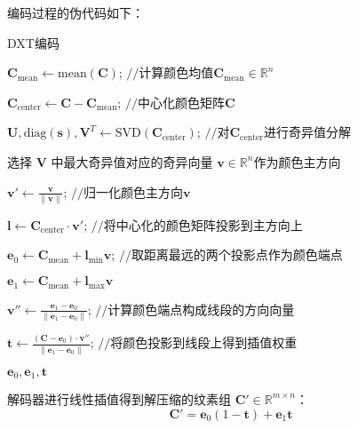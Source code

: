 编码过程的伪代码如下：

\begin{algorithm}[H]
    \caption{DXT编码}
    
    $\mathbf{C}_{\text{mean}} \gets \text{mean}(\mathbf{C})$; \hfill $//$计算颜色均值$\mathbf{C}_{\text{mean}}\in\mathbb{R}^{n}$
    
    $\mathbf{C}_{\text{center}} \gets \mathbf{C} - \mathbf{C}_{\text{mean}}$; \hfill $//$中心化颜色矩阵$\mathbf{C}$
    
    $ \mathbf{U}, \text{diag}(\mathbf{s}), \mathbf{V}^T \gets \text{SVD}(\mathbf{C}_{\text{center}})$; \hfill $//$对$\mathbf{C}_{\text{center}}$进行奇异值分解
    
    选择 $\mathbf{V}$ 中最大奇异值对应的奇异向量 $\mathbf{v} \in \mathbb{R}^{n}$作为颜色主方向\;
    
    $\mathbf{v}' \gets \frac{\mathbf{v}}{\|\mathbf{v}\|}$; \hfill $//$归一化颜色主方向$\mathbf{v}$
    
    $\mathbf{l} \gets \mathbf{C}_{\text{center}} \cdot \mathbf{v}'$; \hfill $//$将中心化的颜色矩阵投影到主方向上
    
    $\mathbf{e}_0 \gets \mathbf{C}_{\text{mean}} + \mathbf{l}_{\text{min}} \mathbf{v}$; \hfill $//$取距离最远的两个投影点作为颜色端点

    $\mathbf{e}_1 \gets \mathbf{C}_{\text{mean}} + \mathbf{l}_{\text{max}} \mathbf{v}$\;
    
    $\mathbf{v''} \gets \frac{\mathbf{e}_1 - \mathbf{e}_0}{\|\mathbf{e}_1 - \mathbf{e}_0\|}$; \hfill $//$计算颜色端点构成线段的方向向量
    
    $\mathbf{t} \gets \frac{(\mathbf{C} - \mathbf{e}_0) \cdot \mathbf{v''}}{\|\mathbf{e}_1 - \mathbf{e}_0\|}$; \hfill $//$将颜色投影到线段上得到插值权重
    
    \Return $\mathbf{e}_0,\mathbf{e}_1,\mathbf{t}$\;
\end{algorithm}

解码器进行线性插值得到解压缩的纹素组 $\mathbf{C}'\in\mathbb{R}^{m\times n}$：
\begin{equation}
\mathbf{C}'=\mathbf{e}_0(1-\mathbf{t})+\mathbf{e}_1\mathbf{t}
\end{equation}

